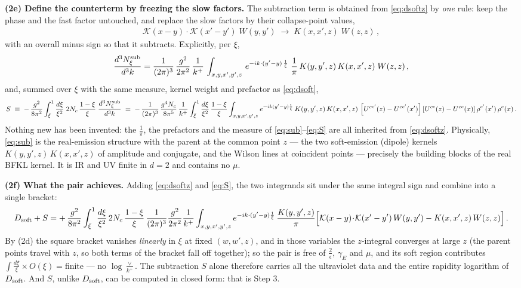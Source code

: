 \documentclass[10pt]{article}
\newcommand{\KK}{\mathcal K(x-y)\!\cdot\!\mathcal K(x'-y')}
\newcommand{\Wz}{\left[U^{ce'}(z) - U^{ce'}(x')\right]\left[U^{ce}(z) - U^{ce}(x)\right]\rho^{e'}(x')\,\rho^{e}(x)}
\begin{document}
\textbf{(2e) Define the counterterm by freezing the slow factors.} The subtraction term is
obtained from \eqref{eq:dsoftz} by \emph{one} rule: keep the phase and the fast factor
untouched, and replace the slow factors by their collapse-point values,
\begin{align}
\KK\;W(y,y')\;\longrightarrow\;K(x,x',z)\;W(z,z)\,,
\end{align}
with an overall minus sign so that it subtracts. Explicitly, per $\xi$,
\begin{align}\label{eq:sub}
\frac{d^{3}N^{\rm sub}_{\xi}}{d^{3}k} = \frac{1}{(2\pi)^{3}}\, \frac{g^{2}}{2\pi^{2}}\, \frac{1}{k^{+}}\,\int_{x,y,x',y',z}\, e^{-ik\cdot (y'-y)\,\frac{1}{\xi}}\;\frac{1}{\pi}\,K(y,y',z)\,K(x,x',z)\;W(z,z)\,,
\end{align}
and, summed over $\xi$ with the same measure, kernel weight and prefactor as \eqref{eq:dsoft},
\begin{align}\label{eq:S}
S \;\equiv\; -\,\frac{g^{2}}{8\pi^{2}}\int_{\bar\xi}^{1}\frac{d\xi}{\xi^{2}}\;2N_{c}\,\frac{1-\xi}{\xi}\;\frac{d^{3}N^{\rm sub}_{\xi}}{d^{3}k}
\;=\;-\,\frac{1}{(2\pi)^{3}}\,\frac{g^{4}N_{c}}{8\pi^{5}}\,\frac{1}{k^{+}}
\int_{\bar\xi}^{1}\frac{d\xi}{\xi^{2}}\,\frac{1-\xi}{\xi}
\int_{x,y,x',y',z} e^{-ik(y'-y)\frac1\xi}\,K(y,y',z)\,K(x,x',z)\,\Wz\,.
\end{align}
Nothing new has been invented: the $\frac{1}{\pi}$, the prefactors and the measure of
\eqref{eq:sub}--\eqref{eq:S} are all inherited from \eqref{eq:dsoftz}. Physically,
\eqref{eq:sub} is the real-emission structure with the parent at the common point $z$ --- the
two soft-emission (dipole) kernels $K(y,y',z)\,K(x,x',z)$ of amplitude and conjugate, and the
Wilson lines at coincident points --- precisely the building blocks of the real BFKL kernel.
It is IR and UV finite in $d=2$ and contains no $\mu$.

\textbf{(2f) What the pair achieves.} Adding \eqref{eq:dsoftz} and \eqref{eq:S}, the two
integrands sit under the same integral sign and combine into a single bracket:
\begin{align}\label{eq:combo}
D_{\rm soft}+S
=+\,\frac{g^{2}}{8\pi^{2}}\int_{\bar\xi}^{1}\frac{d\xi}{\xi^{2}}\,2N_{c}\,\frac{1-\xi}{\xi}\,
\frac{1}{(2\pi)^{3}}\frac{g^{2}}{2\pi^{2}}\frac{1}{k^{+}}
\int_{x,y,x',y',z} e^{-ik\cdot(y'-y)\frac{1}{\xi}}\,\frac{K(y,y',z)}{\pi}
\Big[\KK\,W(y,y')-K(x,x',z)\,W(z,z)\Big]\,.
\end{align}
By (2d) the square bracket vanishes \emph{linearly} in $\xi$ at fixed $(w,w',z)$, and in those
variables the $z$-integral converges at large $z$ (the parent points travel with $z$, so both
terms of the bracket fall off together); so the pair is free of $\frac{2}{\epsilon}$,
$\gamma_{E}$ and $\mu$, and its soft region contributes
$\int\frac{d\xi}{\xi}\times O(\xi)={}$finite --- no $\log\frac{\vee}{k^{+}}$. The subtraction
$S$ alone therefore carries all the ultraviolet data and the entire rapidity logarithm of
$D_{\rm soft}$. And $S$, unlike $D_{\rm soft}$, can be computed in closed form: that is Step 3.
\end{document}

